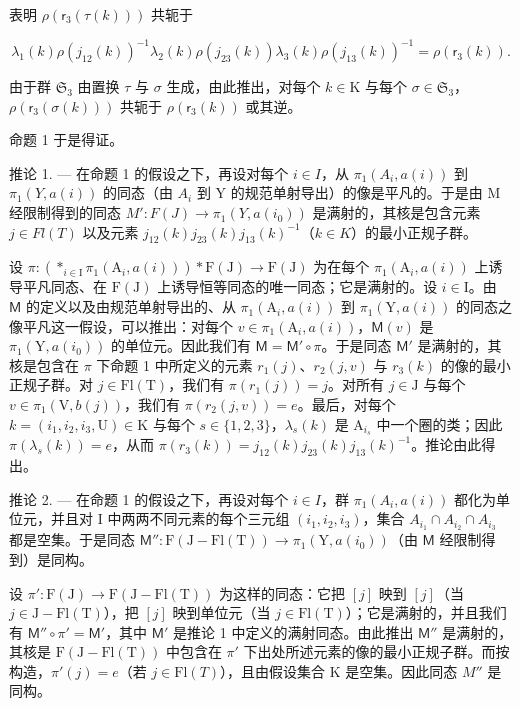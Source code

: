 表明 \(\rho(\mathsf{r}_3(\tau(k)))\) 共轭于

\[
\lambda_ {1} (k) \rho (j _ {1 2} (k)) ^ {- 1} \lambda_ {2} (k) \rho (j _ {2 3} (k)) \lambda_ {3} (k) \rho (j _ {1 3} (k)) ^ {- 1} = \rho (\mathsf {r} _ {3} (k)).
\]

由于群 \(\mathfrak{S}_3\) 由置换 \(\tau\) 与 \(\sigma\) 生成，由此推出，对每个 \(k \in \mathrm{K}\) 与每个 \(\sigma \in \mathfrak{S}_3\)，\(\rho(\mathsf{r}_3(\sigma(k)))\) 共轭于 \(\rho(\mathsf{r}_3(k))\) 或其逆。

命题 1 于是得证。

推论 1. --- 在命题 1 的假设之下，再设对每个 \(i \in I\)，从 \(\pi_1(A_i, a(i))\) 到 \(\pi_1(Y, a(i))\) 的同态（由 \(A_i\) 到 Y 的规范单射导出）的像是平凡的。于是由 M 经限制得到的同态 \(M': F(J) \to \pi_1(Y, a(i_0))\) 是满射的，其核是包含元素 \(j \in Fl(T)\) 以及元素 \(j_{12}(k) j_{23}(k) j_{13}(k)^{-1}\)（\(k \in K\)）的最小正规子群。

设 \(\pi\colon (*_{i\in\mathrm{I}}\pi_1(\mathrm{A}_i,a(i)))*\mathrm{F}(\mathrm{J})\to\mathrm{F}(\mathrm{J})\) 为在每个 \(\pi_1(\mathrm{A}_i,a(i))\) 上诱导平凡同态、在 \(\mathrm{F}(\mathrm{J})\) 上诱导恒等同态的唯一同态；它是满射的。设 \(i\in\mathrm{I}\)。由 \(\mathsf{M}\) 的定义以及由规范单射导出的、从 \(\pi_1(\mathrm{A}_i,a(i))\) 到 \(\pi_1(\mathrm{Y},a(i))\) 的同态之像平凡这一假设，可以推出：对每个 \(v\in\pi_1(\mathrm{A}_i,a(i))\)，\(\mathsf{M}(v)\) 是 \(\pi_1(\mathrm{Y},a(i_0))\) 的单位元。因此我们有 \(\mathsf{M}=\mathsf{M}'\circ\pi\)。于是同态 \(\mathsf{M}'\) 是满射的，其核是包含在 \(\pi\) 下命题 1 中所定义的元素 \(r_1(j)\)、\(r_2(j,v)\) 与 \(r_3(k)\) 的像的最小正规子群。对 \(j\in\mathrm{Fl}(\mathrm{T})\)，我们有 \(\pi(r_1(j))=j\)。对所有 \(j\in\mathrm{J}\) 与每个 \(v\in\pi_1(\mathrm{V},b(j))\)，我们有 \(\pi(r_2(j,v))=e\)。最后，对每个 \(k=(i_1,i_2,i_3,\mathrm{U})\in\mathrm{K}\) 与每个 \(s\in\{1,2,3\}\)，\(\lambda_s(k)\) 是 \(\mathrm{A}_{i_s}\) 中一个圈的类；因此 \(\pi(\lambda_s(k))=e\)，从而 \(\pi(r_3(k))=j_{12}(k)j_{23}(k)j_{13}(k)^{-1}\)。推论由此得出。

推论 2. --- 在命题 1 的假设之下，再设对每个 \(i \in I\)，群 \(\pi_1(A_i, a(i))\) 都化为单位元，并且对 I 中两两不同元素的每个三元组 \((i_1, i_2, i_3)\)，集合 \(A_{i_1} \cap A_{i_2} \cap A_{i_3}\) 都是空集。于是同态 \(\mathsf{M}''\colon \mathrm{F}(\mathrm{J} - \mathrm{Fl}(\mathrm{T})) \to \pi_1(\mathrm{Y}, a(i_0))\)（由 \(\mathsf{M}\) 经限制得到）是同构。

设 \(\pi'\colon\mathrm{F}(\mathrm{J})\to\mathrm{F}(\mathrm{J}-\mathrm{Fl}(\mathrm{T}))\) 为这样的同态：它把 \([j]\) 映到 \([j]\)（当 \(j\in\mathrm{J}-\mathrm{Fl}(\mathrm{T})\)），把 \([j]\) 映到单位元（当 \(j\in\mathrm{Fl}(\mathrm{T})\)）；它是满射的，并且我们有 \(\mathsf{M}''\circ\pi'= \mathsf{M}'\)，其中 \(\mathsf{M}'\) 是推论 1 中定义的满射同态。由此推出 \(\mathsf{M}''\) 是满射的，其核是 \(\mathrm{F}(\mathrm{J}-\mathrm{Fl}(\mathrm{T}))\) 中包含在 \(\pi'\) 下出处所述元素的像的最小正规子群。而按构造，\(\pi'(j) = e\)（若 \(j \in \mathrm{Fl}(T)\)），且由假设集合 K 是空集。因此同态 \(M''\) 是同构。


